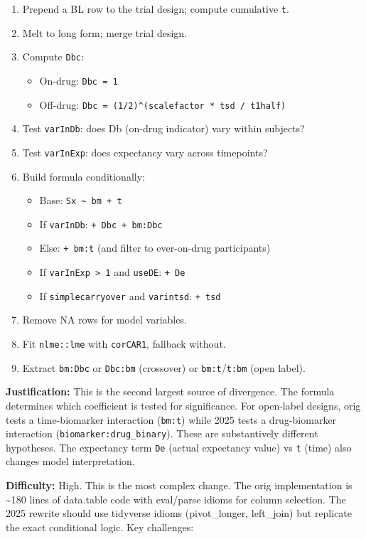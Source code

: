 \documentclass[11pt]{article}
\begin{document}
\begin{enumerate}
  \item Prepend a BL row to the trial design; compute cumulative \texttt{t}.
  \item Melt to long form; merge trial design.
  \item Compute \texttt{Dbc}:
    \begin{itemize}
      \item On-drug: \texttt{Dbc = 1}
      \item Off-drug: \texttt{Dbc = (1/2)\^{}(scalefactor * tsd / t1half)}
    \end{itemize}
  \item Test \texttt{varInDb}: does Db (on-drug indicator) vary within subjects?
  \item Test \texttt{varInExp}: does expectancy vary across timepoints?
  \item Build formula conditionally:
    \begin{itemize}
      \item Base: \texttt{Sx \textasciitilde{} bm + t}
      \item If \texttt{varInDb}: \texttt{+ Dbc + bm:Dbc}
      \item Else: \texttt{+ bm:t} (and filter to ever-on-drug participants)
      \item If \texttt{varInExp > 1} and \texttt{useDE}: \texttt{+ De}
      \item If \texttt{simplecarryover} and \texttt{varintsd}: \texttt{+ tsd}
    \end{itemize}
  \item Remove NA rows for model variables.
  \item Fit \texttt{nlme::lme} with \texttt{corCAR1}, fallback without.
  \item Extract \texttt{bm:Dbc} or \texttt{Dbc:bm} (crossover) or \texttt{bm:t}/\texttt{t:bm}
    (open label).
\end{enumerate}

\textbf{Justification:} This is the second largest source of divergence.
The formula determines which coefficient is tested for significance.
For open-label designs, orig tests a time-biomarker interaction
(\texttt{bm:t}) while 2025 tests a drug-biomarker interaction
(\texttt{biomarker:drug\_binary}). These are substantively different
hypotheses. The expectancy term \texttt{De} (actual expectancy value) vs
\texttt{t} (time) also changes model interpretation.

\textbf{Difficulty:} High. This is the most complex change. The orig
implementation is \textasciitilde 180 lines of data.table code with eval/parse
idioms for column selection. The 2025 rewrite should use
tidyverse idioms (pivot\_longer, left\_join) but replicate the
exact conditional logic. Key challenges:
\end{document}
